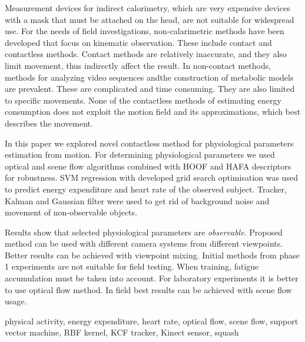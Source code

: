 \abstract
Measurement devices for indirect calorimetry, which are very expensive devices with a mask that must be attached on the head, are not suitable for widespread use. For the needs of field investigations, non-calarimetric methods have been developed that focus on kinematic observation. These include contact and contactless methods. Contact methods are relatively inaccurate, and they also limit movement, thus indirectly affect the result. In non-contact methods, methods for analyzing video sequences andthe construction of metabolic models are prevalent. These are complicated and time consuming. They are also limited to specific movements. None of the contactless methods of estimating energy consumption does not exploit the motion field and its approximations, which best describes the movement.

In this paper we explored novel contactless method for physiological parameters estimation from motion. For determining physiological parameters we used optical and scene flow algorithms combined with HOOF and HAFA descriptors for robustness. SVM regression with developed \nurbf grid search optimisation was used to predict energy expenditure and heart rate of the observed subject. Tracker, Kalman and Gaussian filter were used to get rid of background noise and movement of non-observable objects.

Results show that selected physiological parameters are \emph{observable}. Proposed method can be used with different camera systems from different viewpoints. Better results can be achieved with viewpoint mixing. Initial methods from phase 1 experiments are not suitable for field testing. When training, fatigue accumulation must be taken into account. For laboratory experiments it is better to use optical flow method. In field best results can be achieved with scene flow usage.

\keywords physical activity, energy expenditure, heart rate, optical flow, scene flow, support vector machine, RBF kernel, KCF tracker, Kinect sensor, squash